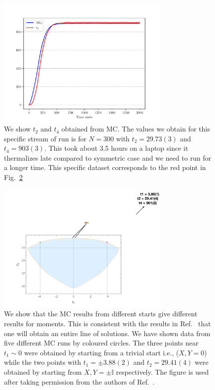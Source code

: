 \documentclass[letter,11pt]{article}
\begin{document}
\begin{figure}[htbp] 
	\centering 
	\includegraphics[width=0.75\textwidth]{figs/2MM_symb_t2_t4.pdf}
	\caption{\label{fig:2MM_t2t4}We show $t_{2}$ and $t_{4}$ obtained from MC. 
	The values we obtain for this specific stream of run is for $N=300$ with $t_{2} = 29.73(3)$ and $t_{4} = 903(3)$. This took about 3.5 hours on a laptop since it thermalizes late compared to symmetric case and we need to run for a longer time. This specific dataset corresponds to the red point in Fig.~\ref{fig:2MM_comp1}}
\end{figure}

\begin{figure}[h] 
	\centering 
	\includegraphics[width=0.75\textwidth]{figs/2MM_symb_ms.pdf}
	\caption{\label{fig:2MM_comp1}We show that the MC results from different starts give different results for moments. This is consistent with the results in Ref.~\cite{Kazakov:2021lel} that one will obtain an entire line of solutions. We have shown data from five different MC runs by coloured circles. The three points near $t_{1} \sim 0$ were obtained by starting from a trivial start i.e., ($X,Y = 0$) while the two points with $t_{1} = \pm 3.88(2)$ and $t_{2}=29.41(4)$ were obtained by starting from $X,Y = \pm \mathbb{I}$ respectively. The figure is used after taking permission from the authors of Ref.~\cite{Kazakov:2021lel}.}
\end{figure}
\end{document}
